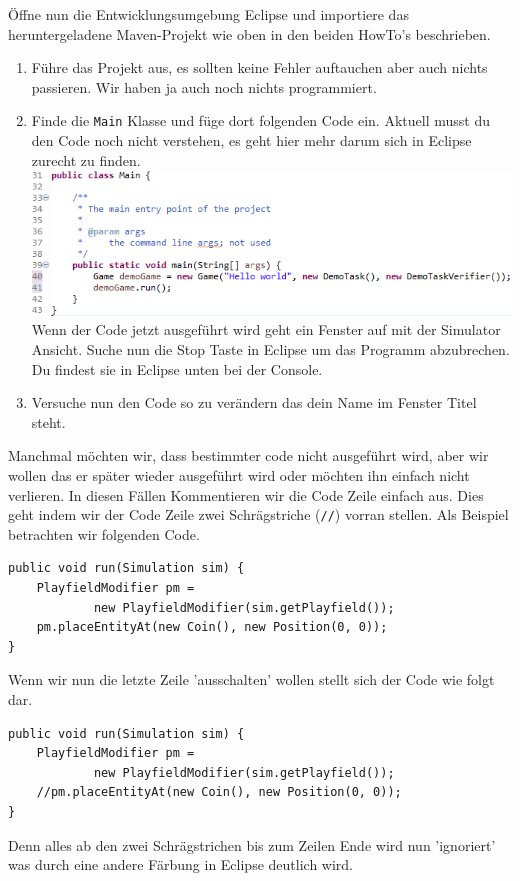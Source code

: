 \newpage

Öffne nun die Entwicklungsumgebung Eclipse und importiere das heruntergeladene Maven-Projekt \jvkpackage wie oben in den beiden HowTo's beschrieben.

\begin{enumerate}[label=\alph*)]
    \item Führe das Projekt aus, es sollten keine Fehler auftauchen aber auch nichts passieren.
    Wir haben ja auch noch nichts programmiert.
    \item Finde die \texttt{Main} Klasse und füge dort folgenden Code ein.
    Aktuell musst du den Code noch nicht verstehen, es geht hier mehr darum sich in Eclipse zurecht zu finden.\\
    \includegraphics[width=\linewidth]{./code.png}\\
    Wenn der Code jetzt ausgeführt wird geht ein Fenster auf mit der Simulator Ansicht.
    Suche nun die Stop Taste in Eclipse um das Programm abzubrechen.
    Du findest sie in Eclipse unten bei der Console.
    \item Versuche nun den Code so zu verändern das dein Name im Fenster Titel steht.
\end{enumerate}

\begin{Infobox}
    Manchmal möchten wir, dass bestimmter code nicht ausgeführt wird, aber wir wollen das er später wieder ausgeführt wird oder möchten ihn einfach nicht verlieren.
    In diesen Fällen Kommentieren wir die Code Zeile einfach aus.
    Dies geht indem wir der Code Zeile zwei Schrägstriche ({\color{javagreen}\texttt{//}}) vorran stellen.
    Als Beispiel betrachten wir folgenden Code.

    \begin{lstlisting}
public void run(Simulation sim) {
    PlayfieldModifier pm =
            new PlayfieldModifier(sim.getPlayfield());
    pm.placeEntityAt(new Coin(), new Position(0, 0));
}
    \end{lstlisting}

    Wenn wir nun die letzte Zeile 'ausschalten' wollen stellt sich der Code wie folgt dar.

    \begin{lstlisting}
public void run(Simulation sim) {
    PlayfieldModifier pm =
            new PlayfieldModifier(sim.getPlayfield());
    //pm.placeEntityAt(new Coin(), new Position(0, 0));
}
    \end{lstlisting}

    Denn alles ab den zwei Schrägstrichen bis zum Zeilen Ende wird nun 'ignoriert' was durch eine andere Färbung in Eclipse deutlich wird.
\end{Infobox}


